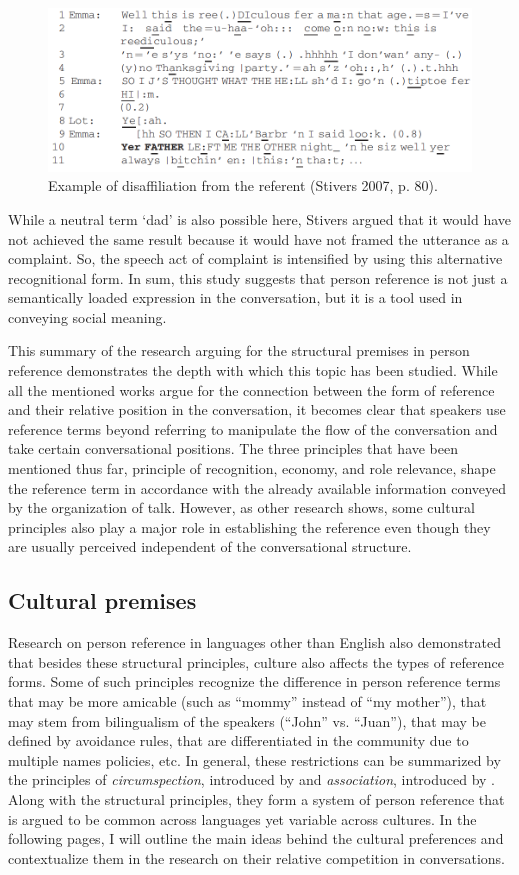 \documentclass[12pt]{article}
\begin{document}
\begin{figure}[h]
\caption{Example of disaffiliation from the referent (Stivers 2007, p. 80).}
\label{stivers}
\includegraphics[width=5in]{stivers.png}
\end{figure}
While a neutral term `dad' is also possible here, Stivers argued that it would have not achieved the same result because it would have not framed the utterance as a complaint. So, the speech act of complaint is intensified by using this alternative recognitional form. In sum, this study suggests that person reference is not just a semantically loaded expression in the conversation, but it is a tool used in conveying social meaning. 

This summary of the research arguing for the structural premises in person reference demonstrates the depth with which this topic has been studied. While all the mentioned works argue for the connection between the form of reference and their relative position in the conversation, it becomes clear that speakers use reference terms beyond referring to manipulate the flow of the conversation and take certain conversational positions. The three principles that have been mentioned thus far, principle of recognition, economy, and role relevance, shape the reference term in accordance with the already available information conveyed by the organization of talk. However, as other research shows, some cultural principles also play a major role in establishing the reference even though they are usually perceived independent of the conversational structure. 
\subsection{Cultural premises}
Research on person reference in languages other than English also demonstrated that besides these structural principles, culture also affects the types of reference forms. Some of such principles recognize the difference in person reference terms that may be more amicable (such as ``mommy'' instead of ``my mother''), that may stem from bilingualism of the speakers (``John'' vs. ``Juan''), that may be defined by avoidance rules, that are differentiated in the community due to multiple names policies, etc. In general, these restrictions can be summarized by the principles of \textit{circumspection}, introduced by \textcite{levinson2007} and \textit{association}, introduced by \textcite{brown2007}. Along with the structural principles, they form a system of person reference that is argued to be common across languages yet variable across cultures. In the following pages, I will outline the main ideas behind the cultural preferences and contextualize them in the research on their relative competition in conversations.  
\end{document}
